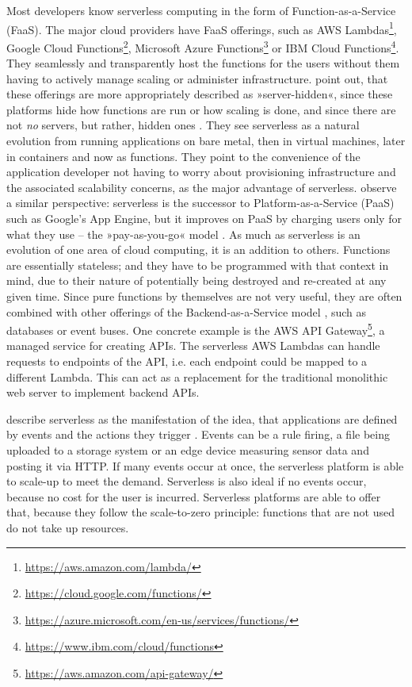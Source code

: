 Most developers know serverless computing in the form of Function-as-a-Service (FaaS). The major cloud providers have FaaS offerings, such as AWS Lambdas\footnote{\url{https://aws.amazon.com/lambda/}}, Google Cloud Functions\footnote{\url{https://cloud.google.com/functions/}}, Microsoft Azure Functions\footnote{\url{https://azure.microsoft.com/en-us/services/functions/}} or IBM Cloud Functions\footnote{\url{https://www.ibm.com/cloud/functions}}. They seamlessly and transparently host the functions for the users without them having to actively manage scaling or administer infrastructure. \citeauthor{Fox2017} point out, that these offerings are more appropriately described as »server-hidden«, since these platforms hide how functions are run or how scaling is done, and since there are not \emph{no} servers, but rather, hidden ones \cite{Fox2017}. They see serverless as a natural evolution from running applications on bare metal, then in virtual machines, later in containers and now as functions. They point to the convenience of the application developer not having to worry about provisioning infrastructure and the associated scalability concerns, as the major advantage of serverless. \citeauthor{Castro2019} observe a similar perspective: serverless is the successor to Platform-as-a-Service (PaaS) such as Google's App Engine, but it improves on PaaS by charging users only for what they use -- the »pay-as-you-go« model \cite{Castro2019}.
As much as serverless is an evolution of one area of cloud computing, it is an addition to others. Functions are essentially stateless; and they have to be programmed with that context in mind, due to their nature of potentially being destroyed and re-created at any given time. Since pure functions by themselves are not very useful, they are often combined with other offerings of the Backend-as-a-Service model \cite{Eismann2021}, such as databases or event buses. One concrete example is the AWS API Gateway\footnote{\url{https://aws.amazon.com/api-gateway/}}, a managed service for creating APIs. The serverless AWS Lambdas can handle requests to endpoints of the API, i.e. each endpoint could be mapped to a different Lambda. This can act as a replacement for the traditional monolithic web server to implement backend APIs.

\citeauthor{McGrath2017} describe serverless as the manifestation of the idea, that applications are defined by events and the actions they trigger \cite{McGrath2017}. Events can be a rule firing, a file being uploaded to a storage system or an edge device measuring sensor data and posting it via HTTP. If many events occur at once, the serverless platform is able to scale-up to meet the demand. Serverless is also ideal if no events occur, because no cost for the user is incurred. Serverless platforms are able to offer that, because they follow the scale-to-zero principle: functions that are not used do not take up resources.

